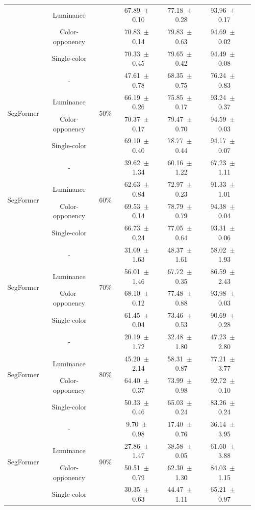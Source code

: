 \begin{table}[h]
\begin{tabular}{@{}lccc ccc@{}}
& Luminance & & 67.89~$\pm$~0.10 & 77.18~$\pm$~0.28 & 93.96~$\pm$~0.17 \\
& Color-opponency & & 70.83~$\pm$~0.14 & 79.83~$\pm$~0.63 & 94.69~$\pm$~0.02 \\
& Single-color & & 70.33~$\pm$~0.45 & 79.65~$\pm$~0.42 & 94.49~$\pm$~0.08 \\
\midrule
\multirow{4}{*}{SegFormer} & - & \multirow{4}{*}{50\%} & 47.61~$\pm$~0.78 & 68.35~$\pm$~0.75 & 76.24~$\pm$~0.83 \\
& Luminance & & 66.19~$\pm$~0.26 & 75.85~$\pm$~0.17 & 93.24~$\pm$~0.37 \\
& Color-opponency & & 70.37~$\pm$~0.17 & 79.47~$\pm$~0.70 & 94.59~$\pm$~0.03 \\
& Single-color & & 69.10~$\pm$~0.40 & 78.77~$\pm$~0.44 & 94.17~$\pm$~0.07 \\
\midrule
\multirow{4}{*}{SegFormer} & - & \multirow{4}{*}{60\%} & 39.62~$\pm$~1.34 & 60.16~$\pm$~1.22 & 67.23~$\pm$~1.11 \\
& Luminance & & 62.63~$\pm$~0.84 & 72.97~$\pm$~0.23 & 91.33~$\pm$~1.01 \\
& Color-opponency & & 69.53~$\pm$~0.14 & 78.79~$\pm$~0.79 & 94.38~$\pm$~0.04 \\
& Single-color & & 66.73~$\pm$~0.24 & 77.05~$\pm$~0.64 & 93.31~$\pm$~0.06 \\
\midrule
\multirow{4}{*}{SegFormer} & - & \multirow{4}{*}{70\%} & 31.09~$\pm$~1.63 & 48.37~$\pm$~1.61 & 58.02~$\pm$~1.93 \\
& Luminance & & 56.01~$\pm$~1.46 & 67.72~$\pm$~0.35 & 86.59~$\pm$~2.43 \\
& Color-opponency & & 68.10~$\pm$~0.12 & 77.48~$\pm$~0.88 & 93.98~$\pm$~0.03 \\
& Single-color & & 61.45~$\pm$~0.04 & 73.46~$\pm$~0.53 & 90.69~$\pm$~0.28 \\
\midrule
\multirow{4}{*}{SegFormer} & - & \multirow{4}{*}{80\%} & 20.19~$\pm$~1.72 & 32.48~$\pm$~1.80 & 47.23~$\pm$~2.80 \\
& Luminance & & 45.20~$\pm$~2.14 & 58.31~$\pm$~0.87 & 77.21~$\pm$~3.77 \\
& Color-opponency & & 64.40~$\pm$~0.37 & 73.99~$\pm$~0.98 & 92.72~$\pm$~0.10 \\
& Single-color & & 50.33~$\pm$~0.46 & 65.03~$\pm$~0.24 & 83.26~$\pm$~0.24 \\
\midrule
\multirow{4}{*}{SegFormer} & - & \multirow{4}{*}{90\%} & 9.70~$\pm$~0.98 & 17.40~$\pm$~0.76 & 36.14~$\pm$~3.95 \\
& Luminance & & 27.86~$\pm$~1.47 & 38.58~$\pm$~0.05 & 61.60~$\pm$~3.88 \\
& Color-opponency & & 50.51~$\pm$~0.79 & 62.30~$\pm$~1.30 & 84.03~$\pm$~1.15 \\
& Single-color & & 30.35~$\pm$~0.63 & 44.47~$\pm$~1.11 & 65.21~$\pm$~0.97 \\
\midrule
\bottomrule
\end{tabular}
\label{tab:sparse_results_segformer_cityscapes}
\end{table}